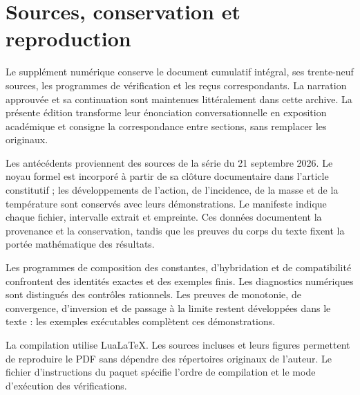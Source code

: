 \section{Sources, conservation et reproduction}
Le supplément numérique conserve le document cumulatif intégral, ses trente-neuf sources, les programmes de vérification et les reçus correspondants. La narration approuvée et sa continuation sont maintenues littéralement dans cette archive. La présente édition transforme leur énonciation conversationnelle en exposition académique et consigne la correspondance entre sections, sans remplacer les originaux.

Les antécédents proviennent des sources de la série du 21 septembre 2026. Le noyau formel est incorporé à partir de sa clôture documentaire dans l'article constitutif ; les développements de l'action, de l'incidence, de la masse et de la température sont conservés avec leurs démonstrations. Le manifeste indique chaque fichier, intervalle extrait et empreinte. Ces données documentent la provenance et la conservation, tandis que les preuves du corps du texte fixent la portée mathématique des résultats.

Les programmes de composition des constantes, d'hybridation et de compatibilité confrontent des identités exactes et des exemples finis. Les diagnostics numériques sont distingués des contrôles rationnels. Les preuves de monotonie, de convergence, d'inversion et de passage à la limite restent développées dans le texte : les exemples exécutables complètent ces démonstrations.

La compilation utilise LuaLaTeX. Les sources incluses et leurs figures permettent de reproduire le PDF sans dépendre des répertoires originaux de l'auteur. Le fichier d'instructions du paquet spécifie l'ordre de compilation et le mode d'exécution des vérifications.
